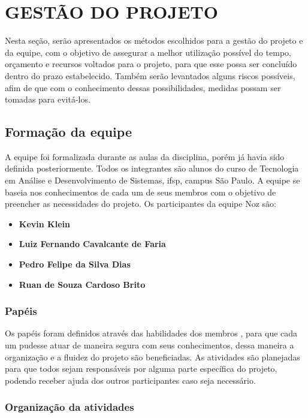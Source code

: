 \chapter{GESTÃO DO PROJETO}

Nesta seção, serão apresentados os métodos escolhidos para a gestão do projeto e da equipe, com o objetivo de assegurar a melhor utilização possível do tempo, orçamento e recursos voltados para o projeto, para que esse possa ser concluído dentro do prazo estabelecido. Também serão levantados alguns riscos possíveis, afim de que com o conhecimento dessas possibilidades, medidas possam ser tomadas para evitá-los.  

\section{Formação da equipe}

A equipe foi formalizada durante as aulas da disciplina, porém já havia sido definida posteriormente. Todos os integrantes são alunos do curso de Tecnologia em Análise e Desenvolvimento de Sistemas, \acs{ifsp}, campus São Paulo. A equipe se baseia nos conhecimentos de cada um de seus membros com o objetivo de preencher as necessidades do projeto. Os participantes da equipe Noz são: 

\begin{itemize}
    \item \textbf{Kevin Klein}
    \item \textbf{Luiz Fernando Cavalcante de Faria}
    \item \textbf{Pedro Felipe da Silva Dias}
    \item \textbf{Ruan de Souza Cardoso Brito}
\end{itemize}

\subsection{Papéis}

Os papéis foram definidos através das habilidades dos membros , para que cada um pudesse atuar de maneira segura com seus conhecimentos, dessa maneira a organização e a fluidez do projeto são beneficiadas. As atividades são planejadas para que todos sejam responsáveis por alguma parte específica do projeto, podendo receber ajuda dos outros participantes caso seja necessário.

\subsection{Organização da atividades}

